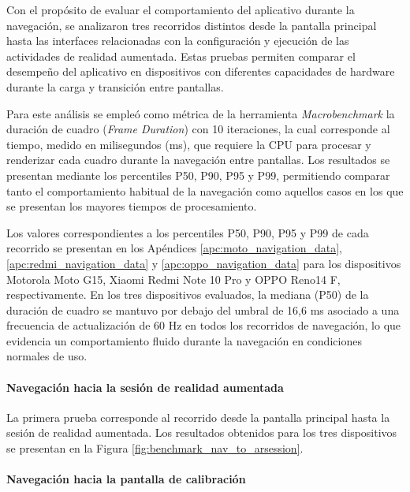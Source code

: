             Con el propósito de evaluar el comportamiento del aplicativo durante la navegación, se analizaron tres recorridos distintos desde la pantalla principal hasta las interfaces relacionadas con la configuración y ejecución de las actividades de realidad aumentada. Estas pruebas permiten comparar el desempeño del aplicativo en dispositivos con diferentes capacidades de hardware durante la carga y transición entre pantallas.

            Para este análisis se empleó como métrica de la herramienta \textit{Macrobenchmark} la duración de cuadro (\textit{Frame Duration}) con 10 iteraciones, la cual corresponde al tiempo, medido en milisegundos (ms), que requiere la CPU para procesar y renderizar cada cuadro durante la navegación entre pantallas. Los resultados se presentan mediante los percentiles P50, P90, P95 y P99, permitiendo comparar tanto el comportamiento habitual de la navegación como aquellos casos en los que se presentan los mayores tiempos de procesamiento.

            Los valores correspondientes a los percentiles P50, P90, P95 y P99 de cada recorrido se presentan en los Apéndices \ref{apc:moto_navigation_data}, \ref{apc:redmi_navigation_data} y \ref{apc:oppo_navigation_data} para los dispositivos Motorola Moto G15, Xiaomi Redmi Note 10 Pro y OPPO Reno14 F, respectivamente. En los tres dispositivos evaluados, la mediana (P50) de la duración de cuadro se mantuvo por debajo del umbral de 16,6 ms asociado a una frecuencia de actualización de 60 Hz en todos los recorridos de navegación, lo que evidencia un comportamiento fluido durante la navegación en condiciones normales de uso.

            \paragraph{Navegación hacia la sesión de realidad aumentada}

                La primera prueba corresponde al recorrido desde la pantalla principal hasta la sesión de realidad aumentada. Los resultados obtenidos para los tres dispositivos se presentan en la Figura \ref{fig:benchmark_nav_to_arsession}.

                

            \paragraph{Navegación hacia la pantalla de calibración}

